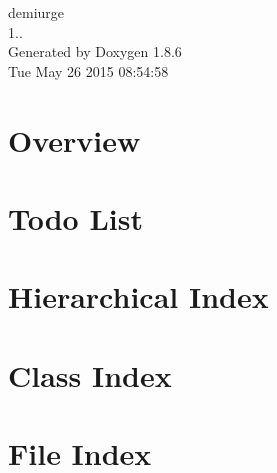 \documentclass[twoside]{book}
\newcommand{\clearemptydoublepage}{%
  \newpage{\pagestyle{empty}\cleardoublepage}%
}
\begin{document}
\hypersetup{pageanchor=false}
\begin{titlepage}
\vspace*{7cm}
\begin{center}%
{\Large demiurge \\[1ex]\large 1.. }\\
\vspace*{1cm}
{\large Generated by Doxygen 1.8.6}\\
\vspace*{0.5cm}
{\small Tue May 26 2015 08:54:58}\\
\end{center}
\end{titlepage}
\clearemptydoublepage
\tableofcontents
\clearemptydoublepage
{}
\hypersetup{pageanchor=true}

\chapter{Overview}
\label{index}\hypertarget{index}{}
\chapter{Todo List}
\label{todo}
\hypertarget{todo}{}

\chapter{Hierarchical Index}

\chapter{Class Index}

\chapter{File Index}

\end{document}
